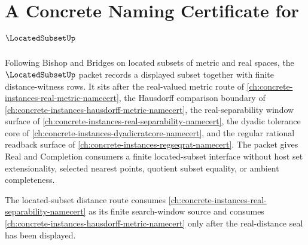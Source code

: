 \chapter{A Concrete Naming Certificate for $\LocatedSubsetUp$}
\label{ch:concrete-instances-located-subset-namecert}

Following Bishop and Bridges on located subsets of metric and real spaces, the $\LocatedSubsetUp$ packet records a displayed subset together with finite distance-witness rows. It sits after the real-valued metric route of \autoref{ch:concrete-instances-real-metric-namecert}, the Hausdorff comparison boundary of \autoref{ch:concrete-instances-hausdorff-metric-namecert}, the real-separability window surface of \autoref{ch:concrete-instances-real-separability-namecert}, the dyadic tolerance core of \autoref{ch:concrete-instances-dyadicratcore-namecert}, and the regular rational readback surface of \autoref{ch:concrete-instances-regseqrat-namecert}. The packet gives Real and Completion consumers a finite located-subset interface without host set extensionality, selected nearest points, quotient subset equality, or ambient completeness.

The located-subset distance route consumes \autoref{ch:concrete-instances-real-separability-namecert} as its finite search-window source and consumes \autoref{ch:concrete-instances-hausdorff-metric-namecert} only after the real-distance seal has been displayed.

